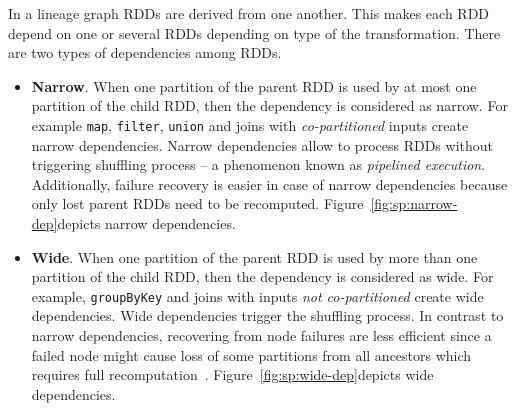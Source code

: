 In a lineage graph RDDs are derived from one another. This makes each RDD depend on one or several RDDs depending on type of the transformation. There are two types of dependencies among RDDs.
\begin{itemize}
    \item \textbf{Narrow}. When one partition of the parent RDD is used by at most one partition of the child RDD, then the dependency is considered as narrow. For example \lstinline$map$, \lstinline$filter$, \lstinline$union$ and joins with \emph{co-partitioned} inputs create narrow dependencies. Narrow dependencies allow to process RDDs without triggering shuffling process -- a phenomenon known as \emph{pipelined execution}. Additionally, failure recovery is easier in case of narrow dependencies because only lost parent RDDs need to be recomputed. Figure~\ref{fig:sp:narrow-dep}\footnotemark depicts narrow dependencies.
    \item \textbf{Wide}. When one partition of the parent RDD is used by more than one partition of the child RDD, then the dependency is considered as wide. For example, \lstinline$groupByKey$ and joins with inputs \emph{not co-partitioned} create wide dependencies. Wide dependencies trigger the shuffling process. In contrast to narrow dependencies, recovering from node failures are less efficient since a failed node might cause loss of some partitions from all ancestors which requires full recomputation~\cite{Zaharia:2012}. Figure~\ref{fig:sp:wide-dep}\footnotemark[\value{footnote}] depicts wide dependencies.
    \begin{figure}[p]
        \centering

\end{figure}
\end{itemize}
